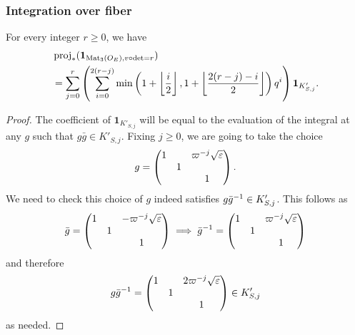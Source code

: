 \subsubsection{Integration over fiber}
\begin{proposition}
  For every integer $r \ge 0$, we have
  \begin{align*}
    &\operatorname{proj}_\ast(\mathbf{1}_{\operatorname{Mat}_3(O_E), v\circ\det=r}) \\
    &= \sum_{j=0}^r \left(
      \sum_{i=0}^{2(r-j)} \min \left( 1 + \left\lfloor \frac i2 \right\rfloor,
        1 + \left\lfloor \frac{2(r-j)-i}{2} \right\rfloor \right) q^i \right)
        \mathbf{1}_{K'_{S,j}}.
  \end{align*}
\end{proposition}
\begin{proof}
  The coefficient of $\mathbf{1}_{K'_{S,j}}$ will be equal to
  the evaluation of the integral at any $g$ such that $g\bar{g} \in K'_{S,j}$.
  Fixing $j \ge 0$, we are going to take the choice
  \[
    g = \begin{pmatrix}
      1 &   & \varpi^{-j} \sqrt{\varepsilon} \\
      & 1 \\
      &   & 1
    \end{pmatrix}.
  \]
  We need to check this choice of $g$ indeed satisfies $g\bar{g}^{-1} \in K'_{S,j}$.
  This follows as
  \[ \bar{g} = \begin{pmatrix} 1 &   & -\varpi^{-j} \sqrt{\varepsilon} \\ & 1 \\ &   & 1 \end{pmatrix}
    \implies \bar{g}^{-1} = \begin{pmatrix} 1 &   & \varpi^{-j} \sqrt{\varepsilon} \\ & 1 \\ &   & 1 \end{pmatrix}
  \]
  and therefore
  \[
    g\bar{g}^{-1} = \begin{pmatrix}
      1 &   & 2\varpi^{-j} \sqrt{\varepsilon} \\
      & 1 \\
      &   & 1
    \end{pmatrix} \in K'_{S,j}
  \]
  as needed.


\end{proof}
